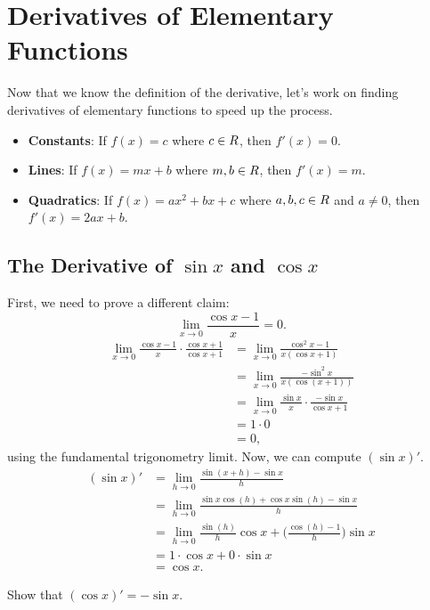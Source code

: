 \section{Derivatives of Elementary Functions}
Now that we know the definition of the derivative, let's work on finding
derivatives of elementary functions to speed up the process.
\begin{itemize}
    \item \textbf{Constants}: If $ f(x)=c $ where $ c\in\relax{R} $, then $ f'(x)=0 $.
    \item \textbf{Lines}: If $ f(x)=mx+b $ where $ m,b\in\relax{R} $, then $ f'(x)=m $.
    \item \textbf{Quadratics}: If $ f(x)=ax^2+bx+c $ where $ a,b,c\in\relax{R} $ and $ a\ne 0 $, then $ f'(x)=2ax+b $.
\end{itemize}
\subsection{The Derivative of \texorpdfstring{$ \sin x $ and $ \cos x $}{sin x and cos x}}
First, we need to prove a different claim:
\[ \displaystyle \lim\limits_{{x} \to {0}}\frac{\cos x-1}{x}=0. \]
\begin{align*}
    \lim\limits_{{x} \to {0}} \frac{\cos x-1}{x}\cdot \frac{\cos x+1}{\cos x+1}
     & =\lim\limits_{{x} \to {0}}\frac{\cos^2 x-1}{x(\cos x+1)}                 \\
     & =\lim\limits_{{x} \to {0}}\frac{-\sin^2 x}{x(\cos(x+1))}                 \\
     & =\lim\limits_{{x} \to {0}}\frac{\sin x}{x}\cdot \frac{-\sin x}{\cos x+1} \\
     & =1\cdot 0                                                                \\
     & =0,
\end{align*}
using the fundamental trigonometry limit. Now, we can compute $ (\sin x)' $.
\begin{align*}
    (\sin x)'
     & =\lim\limits_{{h} \to {0}}\frac{\sin(x+h)-\sin x}{h}                                      \\
     & =\lim\limits_{{h} \to {0}}\frac{\sin x\cos(h)+\cos x\sin(h)-\sin x}{h}                    \\
     & =\lim\limits_{{h} \to {0}}\frac{\sin(h)}{h}\cos x+\biggl(\frac{\cos(h)-1}{h}\biggr)\sin x \\
     & =1\cdot \cos x+0\cdot \sin x                                                              \\
     & =\cos x.
\end{align*}
\begin{Exercise}{}{}
    Show that $ (\cos x)'=-\sin x $.
\end{Exercise}
